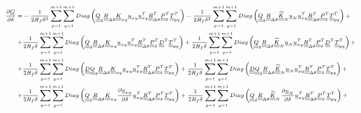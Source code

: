 \documentclass[review]{elsarticle}
\begin{document}
\begin{equation}
\scriptsize
\begin{split}
\frac{\partial \underline{G}}{\partial \delta}=&-\frac{1}{2R_{f}\delta^{2}}\sum_{p=1}^{m+1}\sum_{q=1}^{m+1}Diag\left(\underline{\underline{Q}}_{\delta}\underline{\underline{R}}_{\Delta\theta}\underline{\underline{K}}_{xy}\underline{u}_{xy}\underline{u}_{xy}^{T}\underline{\underline{R}}_{\Delta\theta}^{T}\underline{\underline{P}}_{\delta}^{T}\underline{\underline{T}}_{pq}^{T}\right)-\frac{1}{2R_{f}\delta^{2}}\sum_{p=1}^{m+1}\sum_{q=1}^{m+1}Diag\left(\underline{\underline{Q}}_{\delta}\underline{\underline{R}}_{\Delta\theta}\underline{\underline{\widetilde{K}}}_{N}\underline{u}_{N}\underline{u}_{xy}^{T}\underline{\underline{R}}_{\Delta\theta}^{T}\underline{\underline{P}}_{\delta}^{T}\underline{\underline{T}}_{pq}^{T}\right)+\\
+&\frac{1}{2R_{f}\delta}\sum_{p=1}^{m+1}\sum_{q=1}^{m+1}Diag\left(\underline{\underline{Q}}_{\delta}\underline{\underline{R}}_{\Delta\theta}\underline{\underline{K}}_{xy}\underline{u}_{xy}\underline{u}_{xy}^{T}\underline{\underline{R}}_{\Delta\theta}^{T}\underline{\underline{P}}_{\delta}^{T}\underline{\underline{D}}^{T}\underline{\underline{T}}_{pq}^{T}\right)+\frac{1}{2R_{f}\delta}\sum_{p=1}^{m+1}\sum_{q=1}^{m+1}Diag\left(\underline{\underline{Q}}_{\delta}\underline{\underline{R}}_{\Delta\theta}\underline{\underline{\widetilde{K}}}_{N}\underline{u}_{N}\underline{u}_{xy}^{T}\underline{\underline{R}}_{\Delta\theta}^{T}\underline{\underline{P}}_{\delta}^{T}\underline{\underline{D}}^{T}\underline{\underline{T}}_{pq}^{T}\right)+\\
+&\frac{1}{2R_{f}\delta}\sum_{p=1}^{m+1}\sum_{q=1}^{m+1}Diag\left(\underline{\underline{D}}\underline{\underline{Q}}_{\delta}\underline{\underline{R}}_{\Delta\theta}\underline{\underline{K}}_{xy}\underline{u}_{xy}\underline{u}_{xy}^{T}\underline{\underline{R}}_{\Delta\theta}^{T}\underline{\underline{P}}_{\delta}^{T}\underline{\underline{T}}_{pq}^{T}\right)+\frac{1}{2R_{f}\delta}\sum_{p=1}^{m+1}\sum_{q=1}^{m+1}Diag\left(\underline{\underline{D}}\underline{\underline{Q}}_{\delta}\underline{\underline{R}}_{\Delta\theta}\underline{\underline{\widetilde{K}}}_{N}\underline{u}_{N}\underline{u}_{xy}^{T}\underline{\underline{R}}_{\Delta\theta}^{T}\underline{\underline{P}}_{\delta}^{T}\underline{\underline{T}}_{pq}^{T}\right)+\\
+&\frac{1}{2R_{f}\delta}\sum_{p=1}^{m+1}\sum_{q=1}^{m+1}Diag\left(\underline{\underline{Q}}_{\delta}\underline{\underline{R}}_{\Delta\theta}\underline{\underline{K}}_{xy}\frac{\partial \underline{u}_{xy}}{\partial \delta}\underline{u}_{xy}^{T}\underline{\underline{R}}_{\Delta\theta}^{T}\underline{\underline{P}}_{\delta}^{T}\underline{\underline{T}}_{pq}^{T}\right)+\frac{1}{2R_{f}\delta}\sum_{p=1}^{m+1}\sum_{q=1}^{m+1}Diag\left(\underline{\underline{Q}}_{\delta}\underline{\underline{R}}_{\Delta\theta}\underline{\underline{\widetilde{K}}}_{N}\frac{\partial \underline{u}_{N}}{\partial \delta}\underline{u}_{xy}^{T}\underline{\underline{R}}_{\Delta\theta}^{T}\underline{\underline{P}}_{\delta}^{T}\underline{\underline{T}}_{pq}^{T}\right)+\\

\end{split}
\end{equation}
\end{document}
